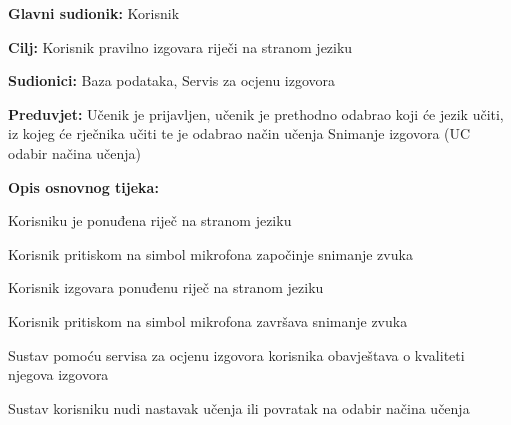 \noindent {}
\begin{packed_item}

	\item \textbf{Glavni sudionik: } Korisnik
	\item \textbf{Cilj: } Korisnik pravilno izgovara riječi na stranom jeziku
	\item \textbf{Sudionici: } Baza podataka, Servis za ocjenu izgovora
	\item \textbf{Preduvjet: } Učenik je prijavljen, učenik je prethodno odabrao koji će jezik učiti, iz kojeg će rječnika učiti te je odabrao način učenja Snimanje izgovora (UC odabir načina učenja)
	\item  \textbf{Opis osnovnog tijeka:} 
	
	\item[] \begin{packed_enum}

		\item Korisniku je ponuđena riječ na stranom jeziku
		\item Korisnik pritiskom na simbol mikrofona započinje snimanje zvuka
		\item Korisnik izgovara ponuđenu riječ na stranom jeziku
		\item Korisnik pritiskom na simbol mikrofona završava snimanje zvuka
		\item Sustav pomoću servisa za ocjenu izgovora korisnika obavještava o kvaliteti njegova izgovora
		\item Sustav korisniku nudi nastavak učenja ili povratak na odabir načina učenja

	\end{packed_enum}

\end{packed_item}


